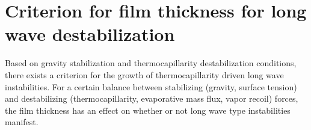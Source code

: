 \documentclass[a4paper,12pt]{article}
\begin{document}



\section{Criterion for film thickness for long wave destabilization}

Based on gravity stabilization and thermocapillarity destabilization conditions, there exists a criterion for the growth of thermocapillarity driven long wave instabilities. For a certain balance between stabilizing (gravity, surface tension) and destabilizing (thermocapillarity, evaporative mass flux, vapor recoil) forces, the film thickness has an effect on whether or not long wave type instabilities manifest.
\end{document}
